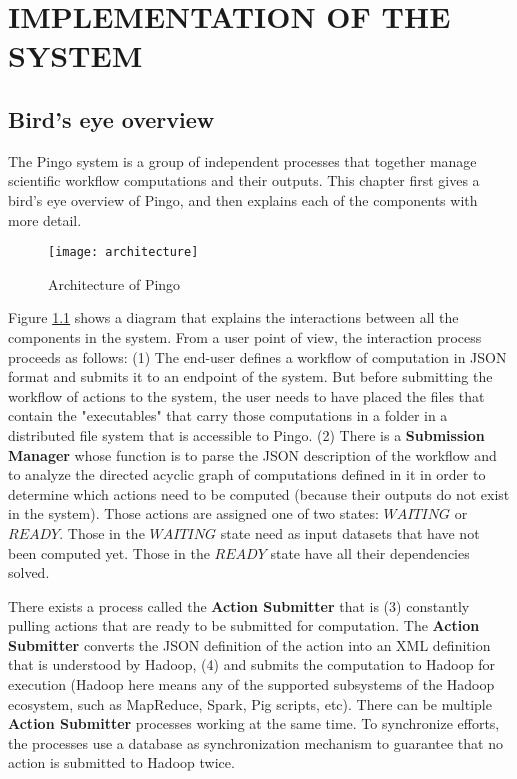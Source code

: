 \chapter{IMPLEMENTATION OF THE SYSTEM}
\label{chap:implementation}
\section{Bird's eye overview}
The Pingo system is a group of independent processes that together manage scientific workflow computations and their outputs.  This chapter first gives a bird's eye overview of Pingo, and then explains each of the components with more detail. 


\begin{figure}
\centering
\texttt{[image: architecture]}
\caption{Architecture of Pingo}
\label{fig:workflow_flow}
\end{figure}
Figure \ref{fig:workflow_flow} shows a diagram that explains the interactions between all the components in the system. From a user point of view, the interaction process proceeds as follows: (1) The end-user defines a workflow of computation in JSON format and submits it to an endpoint of the system. But before submitting the workflow of actions to the system, the user needs to have placed the files that contain the "executables" that carry those computations in a folder in a distributed file system that is accessible to Pingo. (2) There is a \textbf{Submission Manager} whose function is to parse the JSON description of the workflow and to analyze the directed acyclic graph of computations defined in it in order to determine which actions need to be computed (because their outputs do not exist in the system). Those actions are assigned one of two states: $WAITING$ or $READY$. Those in the $WAITING$ state need as input datasets that have not been computed yet.  Those in the $READY$ state have all their dependencies solved.

There exists a process called the \textbf{Action Submitter} that is (3) constantly pulling actions that are ready to be submitted for computation. The \textbf{Action Submitter} converts the JSON definition of the action into an XML definition that is understood by Hadoop, (4) and submits the computation to Hadoop for execution (Hadoop here means any of the supported subsystems of the Hadoop ecosystem, such as MapReduce, Spark, Pig scripts, etc). There can be multiple \textbf{Action Submitter} processes working at the same time.  To synchronize efforts, the processes use a database as synchronization mechanism to guarantee that no action is submitted to Hadoop twice.

